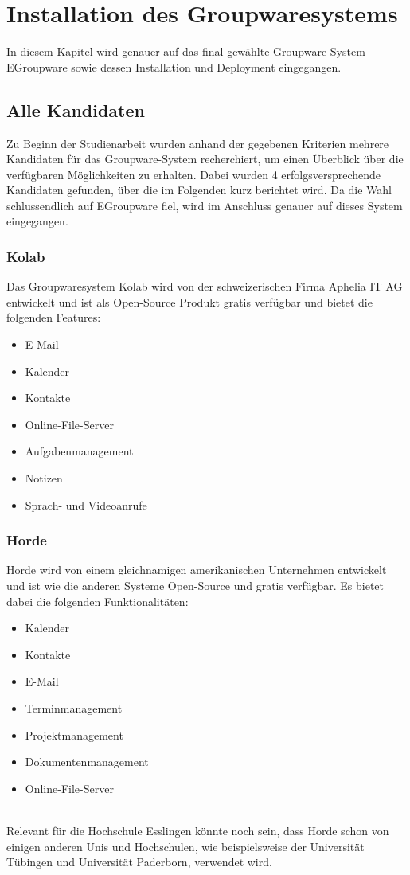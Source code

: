 \chapter{Installation des Groupwaresystems}

In diesem Kapitel wird genauer auf das final gewählte Groupware-System EGroupware sowie dessen Installation und Deployment eingegangen.

\section{Alle Kandidaten}

Zu Beginn der Studienarbeit wurden anhand der gegebenen Kriterien mehrere Kandidaten für das Groupware-System recherchiert, um einen Überblick über die verfügbaren Möglichkeiten zu erhalten.
Dabei wurden 4 erfolgsversprechende Kandidaten gefunden, über die im Folgenden kurz berichtet wird.
Da die Wahl schlussendlich auf EGroupware fiel, wird im Anschluss genauer auf dieses System eingegangen.

\subsection{Kolab}

Das Groupwaresystem Kolab wird von der schweizerischen Firma Aphelia IT AG entwickelt und ist als Open-Source Produkt gratis verfügbar und bietet die folgenden Features:
\begin{itemize}
    \item E-Mail
    \item Kalender
    \item Kontakte
    \item Online-File-Server
    \item Aufgabenmanagement
    \item Notizen
    \item Sprach- und Videoanrufe
\end{itemize}
\autocite{kolab}

\subsection{Horde}

Horde wird von einem gleichnamigen amerikanischen Unternehmen entwickelt und ist wie die anderen Systeme Open-Source und gratis verfügbar. Es bietet dabei die folgenden Funktionalitäten:
\begin{itemize}
    \item Kalender
    \item Kontakte
    \item E-Mail
    \item Terminmanagement
    \item Projektmanagement
    \item Dokumentenmanagement
    \item Online-File-Server
\end{itemize}
\autocite{horde}
\\
Relevant für die Hochschule Esslingen könnte noch sein, dass Horde schon von einigen anderen Unis und Hochschulen, wie beispielsweise der Universität Tübingen und Universität Paderborn, verwendet wird.

